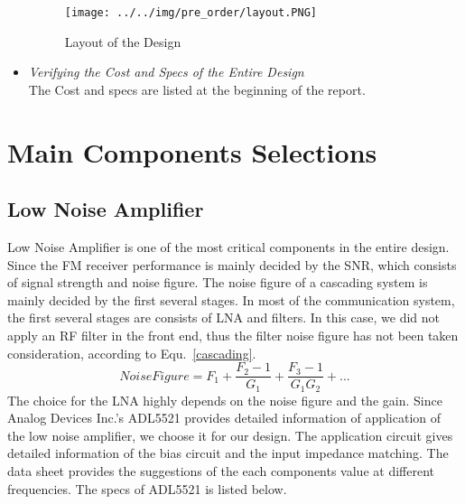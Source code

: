 \documentclass[]{article}
\begin{document}
\begin{itemize}
            \begin{figure}[p]
                \begin{center}
                    \texttt{[image: ../../img/pre\_order/layout.PNG]}~
                    \label{layout}
                    \caption{Layout of the Design}
                \end{center}
            \end{figure}
            
        \item \textit{Verifying the Cost and Specs of the Entire Design} \\
            The Cost and specs are listed at the beginning of the report.

    \end{itemize}

\section{Main Components Selections}
    \subsection{Low Noise Amplifier}
        Low Noise Amplifier is one of the most critical components in the entire
        design. Since the FM receiver performance is mainly decided by the SNR,
        which consists of signal strength and noise figure. The noise figure of
        a cascading system is mainly decided by the first several stages. In
        most of the communication system, the first several stages are consists
        of LNA and filters. In this case, we did not apply an RF filter in the
        front end, thus the filter noise figure has not been taken
        consideration, according to Equ.~\ref{cascading}.
        \begin{equation}
            Noise Figure = F_{1} + \frac{F_{2} - 1}{G_{1}} + \frac{F_{3} -
            1}{G_{1}G_{2}} + ...
            \label{cascading}
        \end{equation}
        The choice for the LNA highly depends on the noise figure and the gain.
        Since Analog Devices Inc.'s ADL5521 provides detailed information of
        application of the low noise amplifier, we choose it for our design. The
        application circuit gives detailed information of the bias circuit and
        the input impedance matching. The data sheet provides the suggestions of
        the each components value at different frequencies. The specs of ADL5521
        is listed below.
\end{document}
